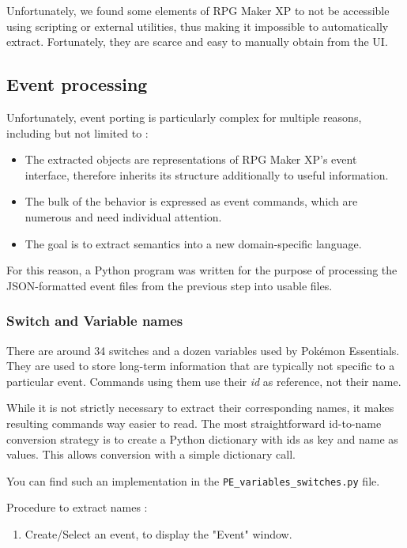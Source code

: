 \documentclass[11pt]{article}
\begin{document}
{Unfortunately, we found some elements of RPG Maker XP to not be accessible using scripting or external utilities, thus making it impossible to automatically extract. Fortunately, they are scarce and easy to manually obtain from the UI.


\subsection{Event processing}

Unfortunately, event porting is particularly complex for multiple reasons, including but not limited to :
\begin{itemize}
	\item The extracted objects are representations of RPG Maker XP's event interface, therefore inherits its structure additionally to useful information.
	
	\item The bulk of the behavior is expressed as event commands, which are numerous and need individual attention.
	
	\item The goal is to extract semantics into a new domain-specific language.
\end{itemize}

For this reason, a Python program was written for the purpose of processing the JSON-formatted event files from the previous step into usable files.



\subsubsection{Switch and Variable names}

There are around 34 switches and a dozen variables used by Pokémon Essentials. They are used to store long-term information that are typically not specific to a particular event. Commands using them use their \textit{id} as reference, not their name.

While it is not strictly necessary to extract their corresponding names, it makes resulting commands way easier to read. The most straightforward id-to-name conversion strategy is to create a Python dictionary with ids as key and name as values. This allows conversion with a simple dictionary call.

You can find such an implementation in the \verb|PE_variables_switches.py| file.

Procedure to extract names :
\begin{enumerate}
	\item Create/Select an event, to display the "Event" window.
	

\end{enumerate}}
\end{document}
